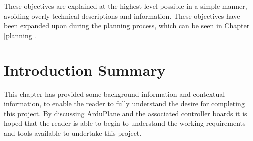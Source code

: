 These objectives are explained at the highest level possible in a simple manner, avoiding overly technical descriptions and information. These objectives have been expanded upon during the planning process, which can be seen in Chapter \ref{planning}.


\section{Introduction Summary}
\label{intro:summary}

This chapter has provided some background information and contextual information, to enable the reader to fully understand the desire for completing this project. By discussing ArduPlane and the associated controller boards it is hoped that the reader is able to begin to understand the working requirements and tools available to undertake this project. 